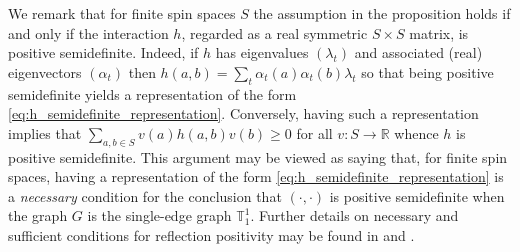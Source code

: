 \documentclass[12pt,reqno]{article}
\def\R{\mathbb{R}}
\def\T{\mathbb{T}}
\begin{document}
We remark that for finite spin spaces $S$ the assumption in the proposition holds if and only if the interaction $h$, regarded as a real symmetric $S\times S$ matrix, is positive semidefinite. Indeed, if $h$ has eigenvalues $(\lambda_t)$ and associated (real) eigenvectors $(\alpha_t)$ then $h(a,b) = \sum_t \alpha_t(a)\alpha_t(b)\lambda_t$ so that being positive semidefinite yields a representation of the form \eqref{eq:h_semidefinite_representation}. Conversely, having such a representation implies that $\sum_{a,b\in S} v(a)h(a,b)v(b)\ge 0$ for all $v:S\to\R$ whence $h$ is positive semidefinite. This argument may be viewed as saying that, for finite spin spaces, having a representation of the form \eqref{eq:h_semidefinite_representation} is a \emph{necessary} condition for the conclusion that $(\cdot, \cdot)$ is positive semidefinite when the graph $G$ is the single-edge graph $\T_1^1$. Further details on necessary and sufficient conditions for reflection positivity may be found in \cite{frohlich1978phase, frohlich1980phase, biskup2009reflection} and \cite[Chapter 10]{friedli2016statistical}.
\end{document}
